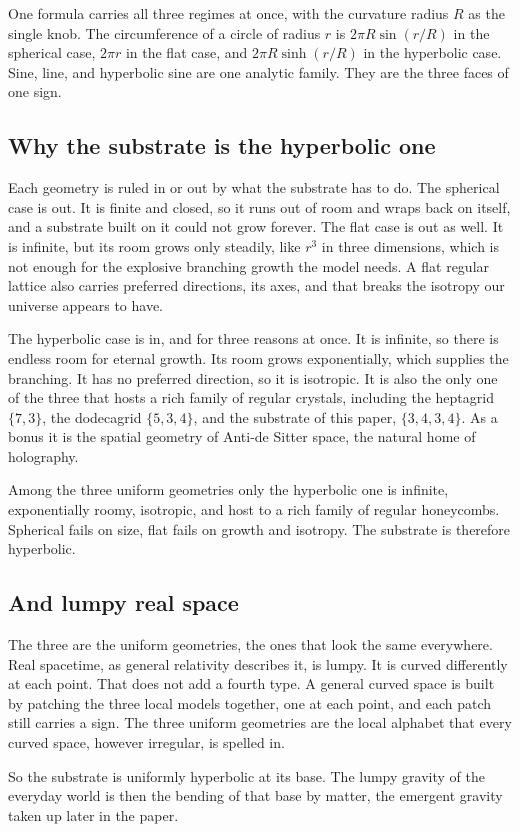One formula carries all three regimes at once, with the curvature radius $R$ as the single knob. The circumference of a circle of radius $r$ is $2\pi R \sin(r/R)$ in the spherical case, $2\pi r$ in the flat case, and $2\pi R \sinh(r/R)$ in the hyperbolic case. Sine, line, and hyperbolic sine are one analytic family. They are the three faces of one sign.

\subsection{Why the substrate is the hyperbolic one}

Each geometry is ruled in or out by what the substrate has to do. The spherical case is out. It is finite and closed, so it runs out of room and wraps back on itself, and a substrate built on it could not grow forever. The flat case is out as well. It is infinite, but its room grows only steadily, like $r^3$ in three dimensions, which is not enough for the explosive branching growth the model needs. A flat regular lattice also carries preferred directions, its axes, and that breaks the isotropy our universe appears to have.

The hyperbolic case is in, and for three reasons at once. It is infinite, so there is endless room for eternal growth. Its room grows exponentially, which supplies the branching. It has no preferred direction, so it is isotropic. It is also the only one of the three that hosts a rich family of regular crystals, including the heptagrid $\{7,3\}$, the dodecagrid $\{5,3,4\}$, and the substrate of this paper, $\{3,4,3,4\}$. As a bonus it is the spatial geometry of Anti-de Sitter space, the natural home of holography.

\begin{result}
Among the three uniform geometries only the hyperbolic one is infinite, exponentially roomy, isotropic, and host to a rich family of regular honeycombs. Spherical fails on size, flat fails on growth and isotropy. The substrate is therefore hyperbolic.
\end{result}

\subsection{And lumpy real space}

The three are the uniform geometries, the ones that look the same everywhere. Real spacetime, as general relativity describes it, is lumpy. It is curved differently at each point. That does not add a fourth type. A general curved space is built by patching the three local models together, one at each point, and each patch still carries a sign. The three uniform geometries are the local alphabet that every curved space, however irregular, is spelled in.

So the substrate is uniformly hyperbolic at its base. The lumpy gravity of the everyday world is then the bending of that base by matter, the emergent gravity taken up later in the paper.
